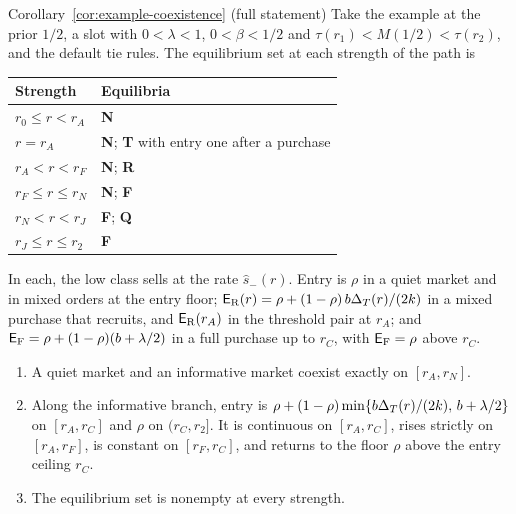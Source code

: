 \begin{named}{Corollary~\ref{cor:example-coexistence} (full statement)}
Take the example at the prior \(1/2\), a slot with \(0<\lambda<1\), \(0<\beta<1/2\) and \(\tau(r_1)<M(1/2)<\tau(r_2)\),
and the default tie rules. The equilibrium set at each strength of the path is
\begin{center}
\begin{tabular}{@{}ll@{}}
\toprule
Strength & Equilibria\\
\midrule
\(r_0\le r<r_A\) & \textbf{N}\\
\(r=r_A\) & \textbf{N}; \textbf{T} with entry one after a purchase\\
\(r_A<r<r_F\) & \textbf{N}; \textbf{R}\\
\(r_F\le r\le r_N\) & \textbf{N}; \textbf{F}\\
\(r_N<r<r_J\) & \textbf{F}; \textbf{Q}\\
\(r_J\le r\le r_2\) & \textbf{F}\\
\bottomrule
\end{tabular}
\end{center}
In each, the low class sells at the rate \(\hat s_-(r)\). Entry is \(\rho\) in a quiet market and in mixed orders at the
entry floor; \(\mathsf{E}_{\rm R}(r)=\rho+(1-\rho)\,b\Delta_T(r)/(2k)\) in a mixed purchase that recruits, and \(\mathsf{E}_{\rm R}(r_A)\)
in the threshold pair at \(r_A\); and \(\mathsf{E}_{\rm F}=\rho+(1-\rho)(b+\lambda/2)\) in a full purchase up to \(r_C\), with
\(\mathsf{E}_{\rm F}=\rho\) above \(r_C\).
\begin{enumerate}[label=(\alph*),leftmargin=2em]
\item A quiet market and an informative market coexist exactly on \([r_A,r_N]\).
\item Along the informative branch, entry is \(\rho+(1-\rho)\min\{b\Delta_T(r)/(2k),\,b+\lambda/2\}\) on \([r_A,r_C]\) and
\(\rho\) on \((r_C,r_2]\). It is continuous on \([r_A,r_C]\), rises strictly on \([r_A,r_F]\), is constant on
\([r_F,r_C]\), and returns to the floor \(\rho\) above the entry ceiling \(r_C\).
\item The equilibrium set is nonempty at every strength.
\end{enumerate}
\end{named}

